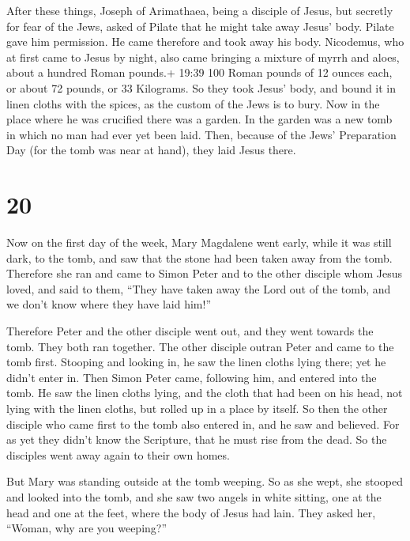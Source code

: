  After these things, Joseph of Arimathaea, being a disciple
of Jesus, but secretly for fear of the Jews, asked of Pilate that he
might take away Jesus' body. Pilate gave him permission. He came
therefore and took away his body.  Nicodemus, who at first
came to Jesus by night, also came bringing a mixture of myrrh and aloes,
about a hundred Roman pounds.+ 19:39 100 Roman pounds of 12 ounces each,
or about 72 pounds, or 33 Kilograms.  So they took Jesus'
body, and bound it in linen cloths with the spices, as the custom of the
Jews is to bury.  Now in the place where he was crucified
there was a garden. In the garden was a new tomb in which no man had
ever yet been laid.  Then, because of the Jews' Preparation
Day (for the tomb was near at hand), they laid Jesus there.

\hypertarget{section-19}{%
\section{20}\label{section-19}}

 Now on the first day of the week, Mary Magdalene went
early, while it was still dark, to the tomb, and saw that the stone had
been taken away from the tomb.  Therefore she ran and came
to Simon Peter and to the other disciple whom Jesus loved, and said to
them, ``They have taken away the Lord out of the tomb, and we don't know
where they have laid him!''

 Therefore Peter and the other disciple went out, and they
went towards the tomb.  They both ran together. The other
disciple outran Peter and came to the tomb first.  Stooping
and looking in, he saw the linen cloths lying there; yet he didn't enter
in.  Then Simon Peter came, following him, and entered into
the tomb. He saw the linen cloths lying,  and the cloth that
had been on his head, not lying with the linen cloths, but rolled up in
a place by itself.  So then the other disciple who came
first to the tomb also entered in, and he saw and believed. 
For as yet they didn't know the Scripture, that he must rise from the
dead.  So the disciples went away again to their own homes.

 But Mary was standing outside at the tomb weeping. So as
she wept, she stooped and looked into the tomb,  and she
saw two angels in white sitting, one at the head and one at the feet,
where the body of Jesus had lain.  They asked her, ``Woman,
why are you weeping?''

